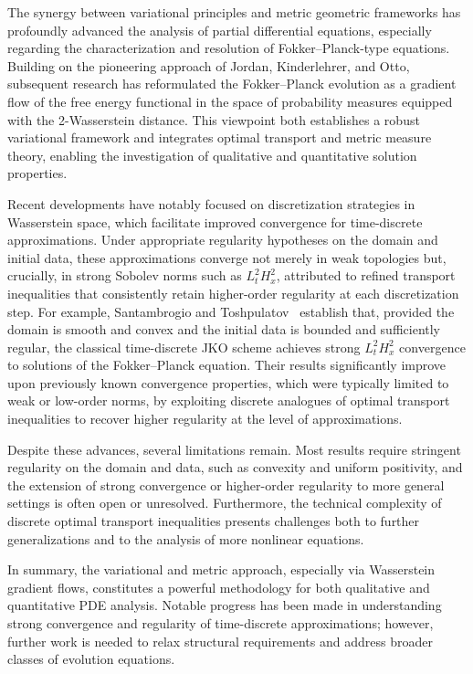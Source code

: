 \documentclass[sigconf]{acmart}
\begin{document}
The synergy between variational principles and metric geometric frameworks has profoundly advanced the analysis of partial differential equations, especially regarding the characterization and resolution of Fokker–Planck-type equations. Building on the pioneering approach of Jordan, Kinderlehrer, and Otto, subsequent research has reformulated the Fokker–Planck evolution as a gradient flow of the free energy functional in the space of probability measures equipped with the 2-Wasserstein distance. This viewpoint both establishes a robust variational framework and integrates optimal transport and metric measure theory, enabling the investigation of qualitative and quantitative solution properties. 

Recent developments have notably focused on discretization strategies in Wasserstein space, which facilitate improved convergence for time-discrete approximations. Under appropriate regularity hypotheses on the domain and initial data, these approximations converge not merely in weak topologies but, crucially, in strong Sobolev norms such as $L^2_t H^2_x$, attributed to refined transport inequalities that consistently retain higher-order regularity at each discretization step. For example, Santambrogio and Toshpulatov~\cite{ref96} establish that, provided the domain is smooth and convex and the initial data is bounded and sufficiently regular, the classical time-discrete JKO scheme achieves strong $L^2_t H^2_x$ convergence to solutions of the Fokker--Planck equation. Their results significantly improve upon previously known convergence properties, which were typically limited to weak or low-order norms, by exploiting discrete analogues of optimal transport inequalities to recover higher regularity at the level of approximations.

Despite these advances, several limitations remain. Most results require stringent regularity on the domain and data, such as convexity and uniform positivity, and the extension of strong convergence or higher-order regularity to more general settings is often open or unresolved. Furthermore, the technical complexity of discrete optimal transport inequalities presents challenges both to further generalizations and to the analysis of more nonlinear equations.

In summary, the variational and metric approach, especially via Wasserstein gradient flows, constitutes a powerful methodology for both qualitative and quantitative PDE analysis. Notable progress has been made in understanding strong convergence and regularity of time-discrete approximations; however, further work is needed to relax structural requirements and address broader classes of evolution equations.
\end{document}
